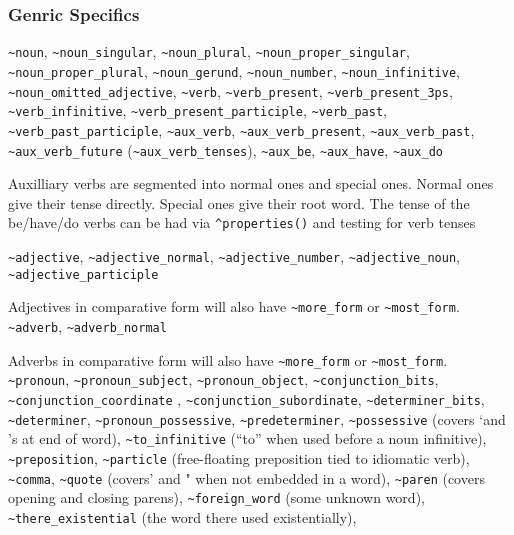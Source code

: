 \documentclass[]{article}
\begin{document}
\subsubsection{Genric Specifics}\label{genric-specifics}

\texttt{\textasciitilde{}noun},
\texttt{\textasciitilde{}noun\_singular},
\texttt{\textasciitilde{}noun\_plural},
\texttt{\textasciitilde{}noun\_proper\_singular},
\texttt{\textasciitilde{}noun\_proper\_plural},
\texttt{\textasciitilde{}noun\_gerund},
\texttt{\textasciitilde{}noun\_number},
\texttt{\textasciitilde{}noun\_infinitive},
\texttt{\textasciitilde{}noun\_omitted\_adjective},
\texttt{\textasciitilde{}verb}, \texttt{\textasciitilde{}verb\_present},
\texttt{\textasciitilde{}verb\_present\_3ps},
\texttt{\textasciitilde{}verb\_infinitive},
\texttt{\textasciitilde{}verb\_present\_participle},
\texttt{\textasciitilde{}verb\_past},
\texttt{\textasciitilde{}verb\_past\_participle},
\texttt{\textasciitilde{}aux\_verb},
\texttt{\textasciitilde{}aux\_verb\_present},
\texttt{\textasciitilde{}aux\_verb\_past},
\texttt{\textasciitilde{}aux\_verb\_future}
(\texttt{\textasciitilde{}aux\_verb\_tenses}),
\texttt{\textasciitilde{}aux\_be}, \texttt{\textasciitilde{}aux\_have},
\texttt{\textasciitilde{}aux\_do}

Auxilliary verbs are segmented into normal ones and special ones. Normal
ones give their tense directly. Special ones give their root word. The
tense of the be/have/do verbs can be had via \texttt{\^{}properties()}
and testing for verb tenses

\texttt{\textasciitilde{}adjective},
\texttt{\textasciitilde{}adjective\_normal},
\texttt{\textasciitilde{}adjective\_number},
\texttt{\textasciitilde{}adjective\_noun},
\texttt{\textasciitilde{}adjective\_participle}

Adjectives in comparative form will also have
\texttt{\textasciitilde{}more\_form} or
\texttt{\textasciitilde{}most\_form}. \texttt{\textasciitilde{}adverb},
\texttt{\textasciitilde{}adverb\_normal}

Adverbs in comparative form will also have
\texttt{\textasciitilde{}more\_form} or
\texttt{\textasciitilde{}most\_form}. \texttt{\textasciitilde{}pronoun},
\texttt{\textasciitilde{}pronoun\_subject},
\texttt{\textasciitilde{}pronoun\_object},
\texttt{\textasciitilde{}conjunction\_bits},
\texttt{\textasciitilde{}conjunction\_coordinate} ,
\texttt{\textasciitilde{}conjunction\_subordinate},
\texttt{\textasciitilde{}determiner\_bits},
\texttt{\textasciitilde{}determiner},
\texttt{\textasciitilde{}pronoun\_possessive},
\texttt{\textasciitilde{}predeterminer},
\texttt{\textasciitilde{}possessive} (covers `and 's at end of word),
\texttt{\textasciitilde{}to\_infinitive} (``to'' when used before a noun
infinitive), \texttt{\textasciitilde{}preposition},
\texttt{\textasciitilde{}particle} (free-floating preposition tied to
idiomatic verb), \texttt{\textasciitilde{}comma},
\texttt{\textasciitilde{}quote} (covers' and " when not embedded in a
word), \texttt{\textasciitilde{}paren} (covers opening and closing
parens), \texttt{\textasciitilde{}foreign\_word} (some unknown word),
\texttt{\textasciitilde{}there\_existential} (the word there used
existentially),
\end{document}
